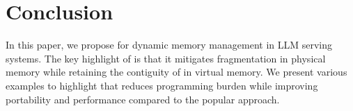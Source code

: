 \section{Conclusion}
\label{sec:conclusion}

In this paper, we propose \sysname for dynamic \kvcache memory management in LLM serving systems. The key highlight of \sysname is that it mitigates fragmentation in physical memory while retaining the contiguity of \kvcache in virtual memory. We present various examples to highlight that \sysname  reduces programming burden while improving portability and performance compared to the popular \pa approach. %

